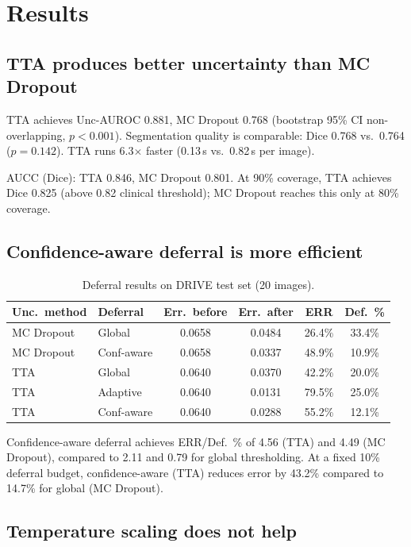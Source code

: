 \documentclass[review,3p]{elsarticle}
\begin{document}
\section{Results}

\subsection{TTA produces better uncertainty than MC Dropout}

TTA achieves Unc-AUROC 0.881, MC Dropout 0.768 (bootstrap 95\% CI non-overlapping,
$p < 0.001$). Segmentation quality is comparable: Dice 0.768 vs.\ 0.764
($p = 0.142$). TTA runs 6.3$\times$ faster (0.13\,s vs.\ 0.82\,s per image).

AUCC (Dice): TTA 0.846, MC Dropout 0.801. At 90\% coverage, TTA achieves Dice
0.825 (above 0.82 clinical threshold); MC Dropout reaches this only at 80\%
coverage.

\subsection{Confidence-aware deferral is more efficient}

\begin{table}[t]
\centering
\caption{Deferral results on DRIVE test set (20 images).}
\begin{tabular}{llcccc}
\toprule
Unc.\ method & Deferral & Err.\ before & Err.\ after & ERR & Def.\ \% \\
\midrule
MC Dropout & Global & 0.0658 & 0.0484 & 26.4\% & 33.4\% \\
MC Dropout & Conf-aware & 0.0658 & 0.0337 & 48.9\% & 10.9\% \\
TTA & Global & 0.0640 & 0.0370 & 42.2\% & 20.0\% \\
TTA & Adaptive & 0.0640 & 0.0131 & 79.5\% & 25.0\% \\
TTA & Conf-aware & 0.0640 & 0.0288 & 55.2\% & 12.1\% \\
\bottomrule
\end{tabular}
\end{table}

Confidence-aware deferral achieves ERR/Def.\ \% of 4.56 (TTA) and 4.49 (MC
Dropout), compared to 2.11 and 0.79 for global thresholding. At a fixed 10\%
deferral budget, confidence-aware (TTA) reduces error by 43.2\% compared to
14.7\% for global (MC Dropout).

\subsection{Temperature scaling does not help}
\end{document}

